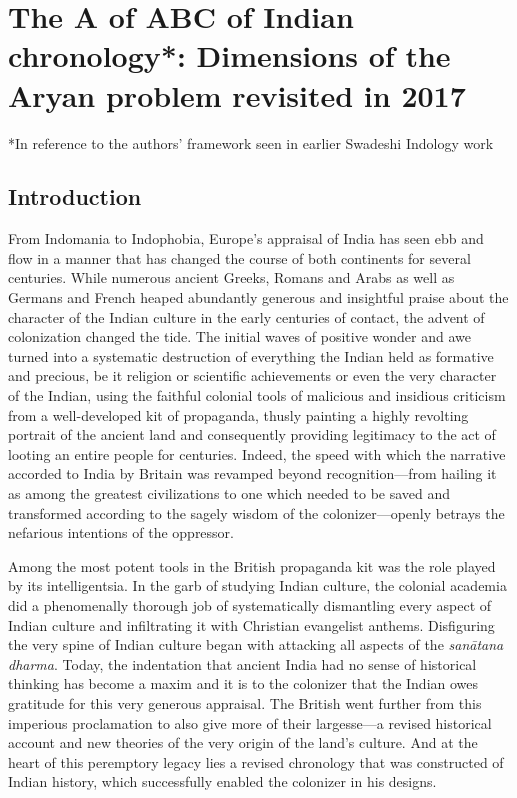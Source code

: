 
\chapter{The A of ABC of Indian chronology*: Dimensions of the Aryan problem revisited in 2017}


*In reference to the authors’ framework seen in earlier Swadeshi Indology work

\section{Introduction}

From Indomania to Indophobia, Europe’s appraisal of India has seen ebb and flow in a manner that has changed the course of both continents for several centuries. While numerous ancient Greeks, Romans and Arabs as well as Germans and French heaped abundantly generous and insightful praise about the character of the Indian culture in the early centuries of contact, the advent of colonization changed the tide. The initial waves of positive wonder and awe turned into a systematic destruction of everything the Indian held as formative and precious, be it religion or scientific achievements or even the very character of the Indian, using the faithful colonial tools of malicious and insidious criticism from a well-developed kit of propaganda, thusly painting a highly revolting portrait of the ancient land and consequently providing legitimacy to the act of looting an entire people for centuries. Indeed, the speed with which the narrative accorded to India by Britain was revamped beyond recognition—from hailing it as among the greatest civilizations to one which needed to be saved and transformed according to the sagely wisdom of the colonizer—openly betrays the nefarious intentions of the oppressor.

Among the most potent tools in the British propaganda kit was the role played by its intelligentsia. In the garb of studying Indian culture, the colonial academia did a phenomenally thorough job of systematically dismantling every aspect of Indian culture and infiltrating it with Christian evangelist anthems. Disfiguring the very spine of Indian culture began with attacking all aspects of the \textit{sanātana dharma}. Today, the indentation that ancient India had no sense of historical thinking has become a maxim and it is to the colonizer that the Indian owes gratitude for this very generous appraisal. The British went further from this imperious proclamation to also give more of their largesse—a revised historical account and new theories of the very origin of the land’s culture. And at the heart of this peremptory legacy lies a revised chronology that was constructed of Indian history, which successfully enabled the colonizer in his designs.


